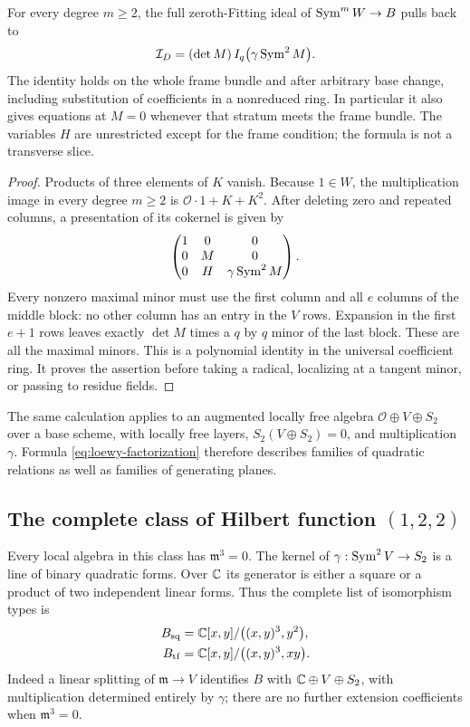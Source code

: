 \begin{theorem}
\label{thm:loewy-factorization}
For every degree $m\ge2$, the full zeroth-Fitting ideal of
$\operatorname{Sym}^m W\to B$ pulls back to
\begin{equation}\label{eq:loewy-factorization}
 \mathcal I_D=(\det M)\,I_q\bigl(\gamma\operatorname{Sym}^2M\bigr).
\end{equation}
The identity holds on the whole frame bundle and after arbitrary
base change, including substitution of coefficients in a nonreduced
ring. In particular it also gives equations at $M=0$ whenever that
stratum meets the frame bundle. The variables $H$ are unrestricted
except for the frame condition; the formula is not a transverse slice.
\end{theorem}
\begin{proof}
Products of three elements of $K$ vanish. Because $1\in W$, the
multiplication image in every degree $m\ge2$ is
$\mathcal O\cdot1+K+K^2$. After deleting zero and repeated columns,
a presentation of its cokernel is given by
\[
 \begin{pmatrix}
 1&0&0\\
 0&M&0\\
 0&H&\gamma\operatorname{Sym}^2M
 \end{pmatrix}.
\]
Every nonzero maximal minor must use the first column and all $e$
columns of the middle block: no other column has an entry in the
$V$ rows. Expansion in the first $e+1$ rows leaves exactly
$\det M$ times a $q$ by $q$ minor of the last block. These are all
the maximal minors. This is a polynomial identity in the universal
coefficient ring. It proves the assertion before taking a radical,
localizing at a tangent minor, or passing to residue fields.
\end{proof}

The same calculation applies to an augmented locally free algebra
$\mathcal O\oplus V\oplus S_2$ over a base scheme, with locally free
layers, $S_2(V\oplus S_2)=0$, and multiplication $\gamma$. Formula
\eqref{eq:loewy-factorization} therefore describes families of quadratic
relations as well as families of generating planes.

\subsection{The complete class of Hilbert function $(1,2,2)$}
Every local algebra in this class has $\mathfrak m^3=0$. The kernel
of $\gamma:\operatorname{Sym}^2V\to S_2$ is a line of binary quadratic forms.
Over $\mathbb C$ its generator is either a square or a product of two
independent linear forms. Thus the complete list of isomorphism types is
\begin{equation}\label{eq:loewy-two-types}
 \begin{split}
 B_{\mathrm{sq}}&=\mathbb C[x,y]/\bigl((x,y)^3,y^2\bigr),\\
 B_{\mathrm{tf}}&=\mathbb C[x,y]/\bigl((x,y)^3,xy\bigr).
 \end{split}
\end{equation}
Indeed a linear splitting of $\mathfrak m\to V$ identifies $B$ with
$\mathbb C\oplus V\oplus S_2$, with multiplication determined entirely by
$\gamma$; there are no further extension coefficients when
$\mathfrak m^3=0$.

